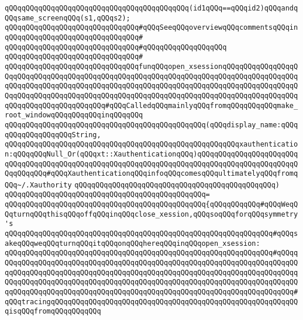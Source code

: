 \verb|qQQqqQQqqQQqqQQqqQQqqQQqqQQqqQQqqQQqqQQqqQQq(id1qQQq==qQQqid2)qQQqandqQQqsame_screenqQQq(s1,qQQqs2);|\newline
\newline
\verb|qQQqqQQqqQQqqQQqqQQqqQQqqQQqqQQq#qQQqSeeqQQqoverviewqQQqcommentsqQQqin|\newline
\verb|qQQqqQQqqQQqqQQqqQQqqQQqqQQqqQQq#|\newline
\verb|qQQqqQQqqQQqqQQqqQQqqQQqqQQqqQQq#qQQqqQQqqQQqqQQqqQQq|\newline
\verb|qQQqqQQqqQQqqQQqqQQqqQQqqQQqqQQq#|\newline
\verb|qQQqqQQqqQQqqQQqqQQqqQQqqQQqqQQqfunqQQqopen_xsessionqQQqqQQqqQQqqQQqqQQqqQQqqQQqqQQqqQQqqQQqqQQqqQQqqQQqqQQqqQQqqQQqqQQqqQQqqQQqqQQqqQQqqQQqqQQqqQQqqQQqqQQqqQQqqQQqqQQqqQQqqQQqqQQqqQQqqQQqqQQqqQQqqQQqqQQqqQQqqQQqqQQqqQQqqQQqqQQqqQQqqQQqqQQqqQQqqQQqqQQqqQQqqQQqqQQqqQQqqQQqqQQqqQQqqQQqqQQqqQQqqQQqqQQqqQQq#qQQqCalledqQQqmainlyqQQqfromqQQqqQQqqQQqmake_root_windowqQQqqQQqqQQqinqQQqqQQq|\newline
\verb|qQQqqQQqqQQqqQQqqQQqqQQqqQQqqQQqqQQqqQQqqQQqqQQq(qQQqdisplay_name:qQQqqQQqqQQqqQQqqQQqString,|\newline
\verb|qQQqqQQqqQQqqQQqqQQqqQQqqQQqqQQqqQQqqQQqqQQqqQQqqQQqqQQqxauthentication:qQQqqQQqNull_Or(qQQqxt::XauthenticationqQQq)qQQqqQQqqQQqqQQqqQQqqQQqqQQqqQQqqQQqqQQqqQQqqQQqqQQqqQQqqQQqqQQqqQQqqQQqqQQqqQQqqQQqqQQqqQQqqQQqqQQqqQQq#qQQqXauthenticationqQQqinfoqQQqcomesqQQqultimatelyqQQqfromqQQq~/.Xauthority|\newline
\verb|qQQqqQQqqQQqqQQqqQQqqQQqqQQqqQQqqQQqqQQqqQQqqQQq)|\newline
\verb|qQQqqQQqqQQqqQQqqQQqqQQqqQQqqQQqqQQqqQQqqQQqqQQq=|\newline
\verb|qQQqqQQqqQQqqQQqqQQqqQQqqQQqqQQqqQQqqQQqqQQqqQQq{qQQqqQQqqQQq#qQQqWeqQQqturnqQQqthisqQQqoffqQQqinqQQqclose_xession,qQQqsoqQQqforqQQqsymmetry's|\newline
\verb|qQQqqQQqqQQqqQQqqQQqqQQqqQQqqQQqqQQqqQQqqQQqqQQqqQQqqQQqqQQqqQQq#qQQqsakeqQQqweqQQqturnqQQqitqQQqonqQQqhereqQQqinqQQqopen_xsession:|\newline
\verb|qQQqqQQqqQQqqQQqqQQqqQQqqQQqqQQqqQQqqQQqqQQqqQQqqQQqqQQqqQQqqQQq#qQQqqQQqqQQqqQQqqQQqqQQqqQQqqQQqqQQqqQQqqQQqqQQqqQQqqQQqqQQqqQQqqQQqqQQqqQQqqQQqqQQqqQQqqQQqqQQqqQQqqQQqqQQqqQQqqQQqqQQqqQQqqQQqqQQqqQQqqQQqqQQqqQQqqQQqqQQqqQQqqQQqqQQqqQQqqQQqqQQqqQQqqQQqqQQqqQQqqQQqqQQqqQQqqQQqqQQqqQQqqQQqqQQqqQQqqQQqqQQqqQQqqQQqqQQqqQQqqQQqqQQqqQQqqQQqqQQqqQQqqQQq#qQQqtracingqQQqqQQqqQQqqQQqqQQqqQQqqQQqqQQqqQQqqQQqqQQqqQQqqQQqqQQqqQQqisqQQqfromqQQqqQQqqQQq|\newline
